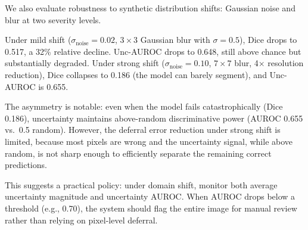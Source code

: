 We also evaluate robustness to synthetic distribution shifts: Gaussian noise
and blur at two severity levels.

\begin{table}[H]
\centering
\caption{Effect of synthetic distribution shift on segmentation and
uncertainty quality. Under mild shift, Dice drops sharply but uncertainty
AUROC degrades more gradually. Under strong shift, both degrade substantially.}
\label{tab:shift}
\small
\setlength{\tabcolsep}{4.6pt}
\end{table}

Under mild shift ($\sigma_{\text{noise}} = 0.02$, $3\times3$ Gaussian blur
with $\sigma = 0.5$), Dice drops to 0.517, a 32\% relative decline. Unc-AUROC
drops to 0.648, still above chance but substantially degraded. Under strong
shift ($\sigma_{\text{noise}} = 0.10$, $7\times7$ blur, 4$\times$ resolution
reduction), Dice collapses to 0.186 (the model can barely segment), and
Unc-AUROC is 0.655.

The asymmetry is notable: even when the model fails catastrophically (Dice
0.186), uncertainty maintains above-random discriminative power (AUROC 0.655
vs.\ 0.5 random). However, the deferral error reduction under strong shift
is limited, because most pixels are wrong and the uncertainty signal, while
above random, is not sharp enough to efficiently separate the remaining correct
predictions.

This suggests a practical policy: under domain shift, monitor both average
uncertainty magnitude and uncertainty AUROC. When AUROC drops below a
threshold (e.g., 0.70), the system should flag the entire image for manual
review rather than relying on pixel-level deferral.
